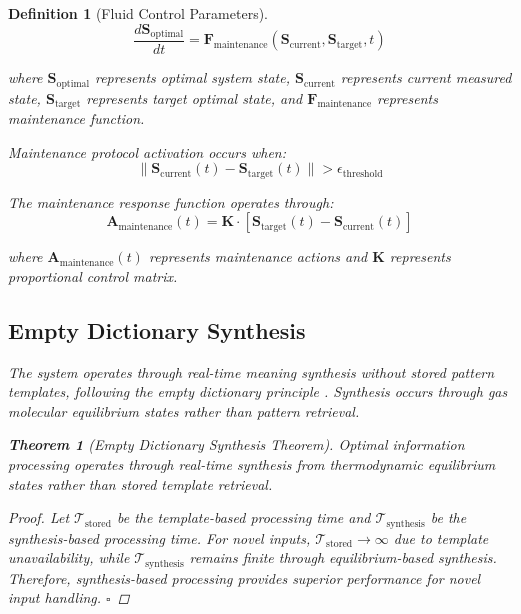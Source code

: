 \documentclass[12pt,a4paper]{article}
\newtheorem{theorem}{Theorem}
\newtheorem{definition}{Definition}
\begin{document}
\begin{definition}[Fluid Control Parameters]
\begin{equation}
\frac{d\mathbf{S}_{\text{optimal}}}{dt} = \mathbf{F}_{\text{maintenance}}(\mathbf{S}_{\text{current}}, \mathbf{S}_{\text{target}}, t)
\end{equation}

where $\mathbf{S}_{\text{optimal}}$ represents optimal system state, $\mathbf{S}_{\text{current}}$ represents current measured state, $\mathbf{S}_{\text{target}}$ represents target optimal state, and $\mathbf{F}_{\text{maintenance}}$ represents maintenance function.

Maintenance protocol activation occurs when:
\begin{equation}
\|\mathbf{S}_{\text{current}}(t) - \mathbf{S}_{\text{target}}(t)\| > \epsilon_{\text{threshold}}
\end{equation}

The maintenance response function operates through:
\begin{equation}
\mathbf{A}_{\text{maintenance}}(t) = \mathbf{K} \cdot [\mathbf{S}_{\text{target}}(t) - \mathbf{S}_{\text{current}}(t)]
\end{equation}

where $\mathbf{A}_{\text{maintenance}}(t)$ represents maintenance actions and $\mathbf{K}$ represents proportional control matrix.

\subsection{Empty Dictionary Synthesis}

The system operates through real-time meaning synthesis without stored pattern templates, following the empty dictionary principle \cite{sachikonye2024perception}. Synthesis occurs through gas molecular equilibrium states rather than pattern retrieval.

\begin{theorem}[Empty Dictionary Synthesis Theorem]
Optimal information processing operates through real-time synthesis from thermodynamic equilibrium states rather than stored template retrieval.
\end{theorem}

\begin{proof}
Let $\mathcal{T}_{\text{stored}}$ be the template-based processing time and $\mathcal{T}_{\text{synthesis}}$ be the synthesis-based processing time. For novel inputs, $\mathcal{T}_{\text{stored}} \to \infty$ due to template unavailability, while $\mathcal{T}_{\text{synthesis}}$ remains finite through equilibrium-based synthesis. Therefore, synthesis-based processing provides superior performance for novel input handling. $\square$
\end{proof}


\end{definition}
\end{document}
